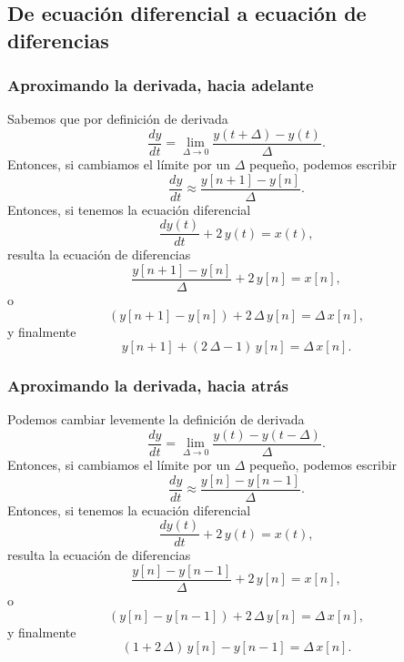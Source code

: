 \subsection{De ecuación diferencial a ecuación de diferencias}

\subsubsection{Aproximando la derivada, hacia adelante}
Sabemos que por definición de derivada
\begin{equation}
	\frac{dy}{dt} = \lim_{\Delta \rightarrow 0} \frac{y(t+\Delta) - y(t)}{\Delta}.
\end{equation}
Entonces, si cambiamos el límite por un $\Delta$ pequeño, podemos escribir
\begin{equation}
	\frac{dy}{dt} \approx \frac{y[n+1] - y[n]}{\Delta}.
\end{equation}
Entonces, si tenemos la ecuación diferencial
\begin{equation}
	\frac{dy(t)}{dt} + 2 \, y(t) = x(t),
\end{equation}
resulta la ecuación de diferencias
\begin{equation}
	\frac{y[n+1] - y[n]}{\Delta} + 2 \, y[n] = x[n],
\end{equation}
o
\begin{equation}
	(y[n+1] - y[n]) + 2 \,  \Delta \, y[n] = \Delta \, x[n],
\end{equation}
y finalmente
\begin{equation}
	y[n+1] + (2 \, \Delta - 1) \, y[n] = \Delta \, x[n].
\end{equation}

\subsubsection{Aproximando la derivada, hacia atrás}
Podemos cambiar levemente la definición de derivada
\begin{equation}
	\frac{dy}{dt} = \lim_{\Delta \rightarrow 0} \frac{y(t) - y(t-\Delta)}{\Delta}.
\end{equation}
Entonces, si cambiamos el límite por un $\Delta$ pequeño, podemos escribir
\begin{equation}
	\frac{dy}{dt} \approx \frac{y[n] - y[n-1]}{\Delta}.
\end{equation}
Entonces, si tenemos la ecuación diferencial
\begin{equation}
	\frac{dy(t)}{dt} + 2 \, y(t) = x(t),
\end{equation}
resulta la ecuación de diferencias
\begin{equation}
	\frac{y[n] - y[n-1]}{\Delta} + 2 \, y[n] = x[n],
\end{equation}
o
\begin{equation}
	(y[n] - y[n-1]) + 2 \,  \Delta \, y[n] = \Delta \, x[n],
\end{equation}
y finalmente
\begin{equation}
	(1 + 2 \, \Delta) \, y[n] - y[n-1] = \Delta \, x[n].
\end{equation}

